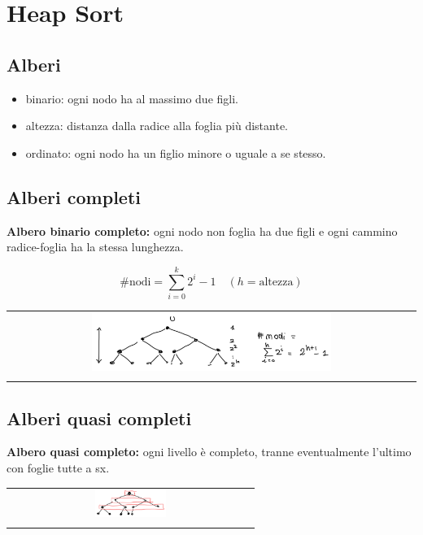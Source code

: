 \section{Heap Sort}

\subsection{Alberi}
\begin{itemize}
    \item binario: ogni nodo ha al massimo due figli.
    \item altezza: distanza dalla radice alla foglia più distante.
    \item ordinato: ogni nodo ha un figlio minore o uguale a se stesso.
\end{itemize}

\subsection{Alberi completi}
\begin{mdframed}
    \textbf{Albero binario completo:} ogni nodo non foglia ha due figli e ogni cammino radice-foglia ha la stessa lunghezza.
\end{mdframed}
\begin{equation*}
    \text{\# nodi} = \sum_{i=0}^k 2^i -1 \quad (h = \text{altezza})
\end{equation*}
\begin{center}
    \begin{tabular}{c}
        \\ \includegraphics[width=0.6\textwidth]{image/AlberoCompleto.png} \\ \\
    \end{tabular}
\end{center}

\subsection{Alberi quasi completi}
\begin{mdframed}
    \textbf{Albero quasi completo:} ogni livello è completo, tranne eventualmente l’ultimo con foglie tutte a sx.
\end{mdframed}
\begin{center}
    \begin{tabular}{c}
        \\ \includegraphics[width=0.3\textwidth]{image/AlberoQuasiCompleto.png} \\ \\
    \end{tabular}
\end{center}

